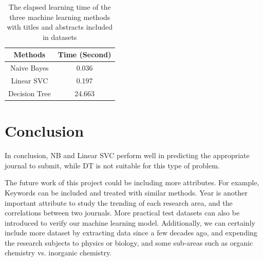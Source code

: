 \documentclass[conference]{IEEEtran}
\begin{document}
\begin{table}
    \caption{The elapsed learning time of the three machine learning methods with titles and abstracts included in datasets\label{tab:performance}}
    \begin{center}
        \begin{tabular}{c | c }
            \hline
            \bf{Methods} & \bf{Time (Second)} \\
            \hline
            Naive Bayes &  0.036 \\
            \hline
            Linear SVC & 0.197 \\
            \hline
            Decision Tree &  24.663\\
            \hline
        \end{tabular}
    \end{center}
\end{table}

\section{Conclusion}
In conclusion, NB and Linear SVC perform well in predicting the appropriate journal to submit, while DT is not suitable for this type of problem.

The future work of this project could be including more attributes. For example, Keywords can be included and treated with similar methods. Year is another important attribute to study the trending of each research area, and the correlations between two journals. More practical test datasets can also be introduced to verify our machine learning model. Additionally, we can certainly include more dataset by extracting data since a few decades ago, and expending the research subjects to physics or biology, and some sub-areas such as organic chemistry vs. inorganic chemistry.










%
%
%




\end{document}
